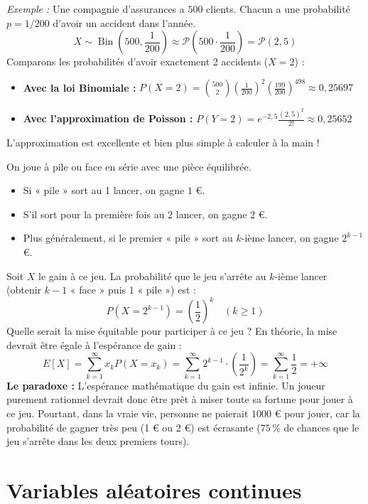 \begin{description}
    \textit{Exemple :} Une compagnie d'assurances a $500$ clients. Chacun a une probabilité $p = 1/200$ d'avoir un accident dans l'année. 
    \[
    X \sim \operatorname{Bin}\left(500, \frac{1}{200}\right) \approx \mathcal{P}\left(500 \cdot \frac{1}{200}\right) = \mathcal{P}(2{,}5)
    \]
    Comparons les probabilités d'avoir exactement 2 accidents ($X=2$) :
    \begin{itemize}
        \item \textbf{Avec la loi Binomiale :} $P(X=2) = \binom{500}{2} \left(\frac{1}{200}\right)^2 \left(\frac{199}{200}\right)^{498} \approx 0{,}25697$
        \item \textbf{Avec l'approximation de Poisson :} $P(Y=2) = e^{-2{,}5} \frac{(2{,}5)^2}{2!} \approx 0{,}25652$
    \end{itemize}
    L'approximation est excellente et bien plus simple à calculer à la main !
\end{description}

\begin{exemple}
    On joue à pile ou face en série avec une pièce équilibrée. 
    \begin{itemize}
        \item Si « pile » sort au 1 lancer, on gagne $1$ €.
        \item S'il sort pour la première fois au 2 lancer, on gagne $2$ €.
        \item Plus généralement, si le premier « pile » sort au $k$-ième lancer, on gagne $2^{k-1}$ €.
    \end{itemize}
    Soit $X$ le gain à ce jeu. La probabilité que le jeu s'arrête au $k$-ième lancer (obtenir $k-1$ « face » puis $1$ « pile ») est :
    \[
    P(X = 2^{k-1}) = \left(\frac{1}{2}\right)^k \quad (k \ge 1)
    \]
    Quelle serait la mise équitable pour participer à ce jeu ? En théorie, la mise devrait être égale à l'espérance de gain :
    \[
    E[X] = \sum_{k=1}^\infty x_k P(X = x_k) = \sum_{k=1}^\infty 2^{k-1} \cdot \left(\frac{1}{2^k}\right) = \sum_{k=1}^\infty \frac{1}{2} = +\infty
    \]
    \textbf{Le paradoxe :} L'espérance mathématique du gain est infinie. Un joueur purement rationnel devrait donc être prêt à miser toute sa fortune pour jouer à ce jeu. Pourtant, dans la vraie vie, personne ne paierait $1000$ € pour jouer, car la probabilité de gagner très peu (1 € ou 2 €) est écrasante ($75\,\%$ de chances que le jeu s'arrête dans les deux premiers tours).
\end{exemple}
\section{Variables aléatoires continues}


